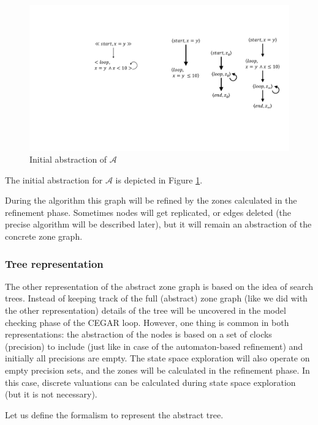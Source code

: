 \begin{figure}
	\centering
	\includegraphics[width=.2\textwidth]{include/figures/graph_init}
	\caption{Initial abstraction of $\mathcal{A}$}
	\label{fig:graphinit}
\end{figure}

\begin{runningExample}
	The initial abstraction for $\mathcal{A}$ is depicted in Figure \ref{fig:graphinit}.
\end{runningExample}

During the algorithm this graph will be refined by the zones calculated in the refinement phase. Sometimes nodes will get replicated, or edges deleted (the precise algorithm will be described later), but it will remain  an abstraction of the concrete zone graph. 



 

\subsubsection{Tree representation}
The other representation of the abstract zone graph is based on the idea of search trees. Instead of keeping track of the full (abstract) zone graph (like we did with the other representation) details of the tree will be uncovered in the model checking phase of the CEGAR loop. However, one thing is common in both representations:  the abstraction of the nodes is based on a set of clocks (precision) to include (just like in case of the automaton-based refinement) and initially all precisions are empty. The state space exploration will also operate on empty precision sets, and the zones will be calculated in the refinement phase. In this case, discrete valuations can be calculated during state space exploration (but it is not necessary).

Let us define the formalism to represent the abstract tree.

